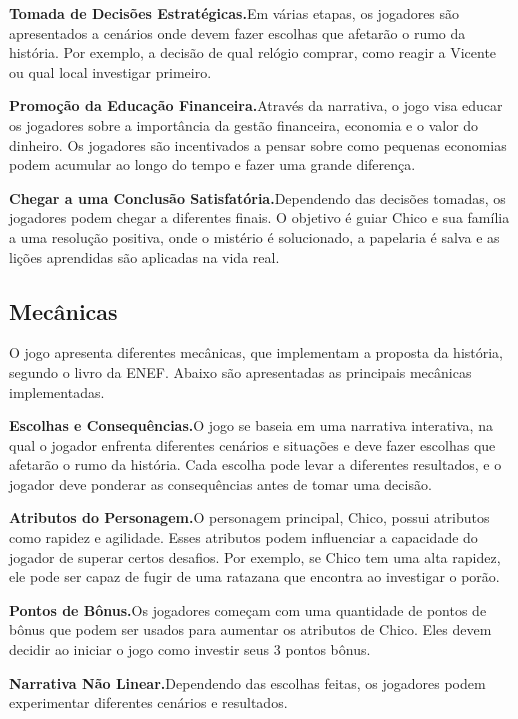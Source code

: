 \medskip\noindent \textbf{Tomada de Decisões Estratégicas.}\quad Em várias etapas, os jogadores são apresentados a cenários onde devem fazer escolhas que afetarão o rumo da história. Por exemplo, a decisão de qual relógio comprar, como reagir a Vicente ou qual local investigar primeiro.

\medskip\noindent \textbf{Promoção da Educação Financeira.}\quad Através da narrativa, o jogo visa educar os jogadores sobre a importância da gestão financeira, economia e o valor do dinheiro. Os jogadores são incentivados a pensar sobre como pequenas economias podem acumular ao longo do tempo e fazer uma grande diferença.

\medskip\noindent \textbf{Chegar a uma Conclusão Satisfatória.}\quad Dependendo das decisões tomadas, os jogadores podem chegar a diferentes finais. O objetivo é guiar Chico e sua família a uma resolução positiva, onde o mistério é solucionado, a papelaria é salva e as lições aprendidas são aplicadas na vida real.


\subsection{Mecânicas}

O jogo apresenta diferentes mecânicas, que implementam a proposta da história, segundo o livro da ENEF. Abaixo são apresentadas as principais mecânicas implementadas.

\medskip\noindent \textbf{Escolhas e Consequências.}\quad O jogo se baseia em uma narrativa interativa, na qual o jogador enfrenta diferentes cenários e situações e deve fazer escolhas que afetarão o rumo da história. Cada escolha pode levar a diferentes resultados, e o jogador deve ponderar as consequências antes de tomar uma decisão.

\medskip\noindent \textbf{Atributos do Personagem.}\quad O personagem principal, Chico, possui atributos como rapidez e agilidade. Esses atributos podem influenciar a capacidade do jogador de superar certos desafios. Por exemplo, se Chico tem uma alta rapidez, ele pode ser capaz de fugir de uma ratazana que encontra ao investigar o porão.

\medskip\noindent \textbf{Pontos de Bônus.}\quad Os jogadores começam com uma quantidade de pontos de bônus que podem ser usados para aumentar os atributos de Chico. Eles devem decidir ao iniciar o jogo como investir seus 3 pontos bônus.

\medskip\noindent \textbf{Narrativa Não Linear.}\quad Dependendo das escolhas feitas, os jogadores podem experimentar diferentes cenários e resultados.


